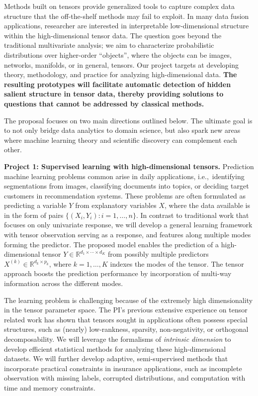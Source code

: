 \documentclass[10pt]{article}
\theoremstyle{plain}
\theoremstyle{definition}
\begin{document}
Methods built on tensors provide generalized tools to capture complex data structure that the off-the-shelf methods may fail to exploit. In many data fusion applications, researcher are interested in interpretable low-dimensional structure within the high-dimensional tensor data. The question goes beyond the traditional multivariate analysis; we aim to characterize probabilistic distributions over higher-order ``objects'', where the objects can be images, networks, manifolds, or in general, tensors. Our project targets at developing theory, methodology, and practice for analyzing high-dimensional data. {\bf The resulting prototypes will facilitate automatic detection of hidden salient structure in tensor data, thereby providing solutions to questions that cannot be addressed by classical methods.} 


The proposal focuses on two main directions outlined below. The ultimate goal is to not only bridge data analytics to domain science, but also spark new areas where machine learning theory and scientific discovery can complement each other.

{\bf Project 1: Supervised learning with high-dimensional tensors.} Prediction machine learning problems common arise in daily applications, i.e.,\ identifying segmentations from images, classifying documents into topics, or deciding target customers in recommendation systems. These problems are often formulated as predicting a variable $Y$ from explanatory variables $X$, where the data available is in the form of pairs $\{(X_i, Y_i): i=1,\ldots,n\}$. In contrast to traditional work that focuses on only univariate response, we will develop a general learning framework with tensor observation serving as a response, and features along multiple modes forming the predictor. The proposed model enables the prediction of a high-dimensional tensor $Y\in\mathbb{R}^{d_1\times \cdots \times d_K}$ from possibly multiple predictors $X^{(k)}\in\mathbb{R}^{d_k\times p_k}$, where $k=1,\ldots,K$ indexes the modes of the tensor. The tensor approach boosts the prediction performance by incorporation of multi-way information across the different modes. 


The learning problem is challenging because of the extremely high dimensionality in the tensor parameter space. The PI's previous extensive experience on tensor related work has shown that tensors sought in applications often possess special structures, such as (nearly) low-rankness, sparsity, non-negativity, or orthogonal decomposability. We will leverage the formalisms of \emph{intrinsic dimension} to develop efficient statistical methods for analyzing these high-dimensional datasets. We will further develop adaptive, semi-supervised methods that incorporate practical constraints in insurance applications, such as incomplete observation with missing labels, corrupted distributions, and computation with time and memory constraints. 
\end{document}

